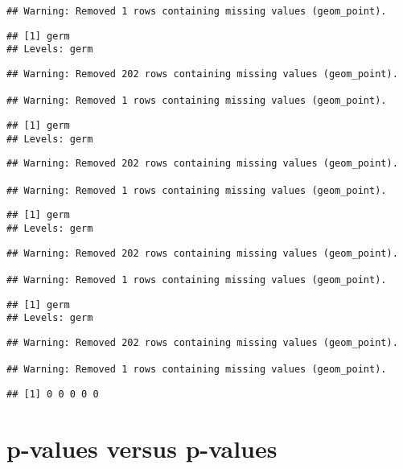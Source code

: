 \documentclass[]{article}
\begin{document}
\begin{verbatim}
## Warning: Removed 1 rows containing missing values (geom_point).
\end{verbatim}

\begin{verbatim}
## [1] germ
## Levels: germ
\end{verbatim}

\begin{verbatim}
## Warning: Removed 202 rows containing missing values (geom_point).

## Warning: Removed 1 rows containing missing values (geom_point).
\end{verbatim}

\begin{verbatim}
## [1] germ
## Levels: germ
\end{verbatim}

\begin{verbatim}
## Warning: Removed 202 rows containing missing values (geom_point).

## Warning: Removed 1 rows containing missing values (geom_point).
\end{verbatim}

\begin{verbatim}
## [1] germ
## Levels: germ
\end{verbatim}

\begin{verbatim}
## Warning: Removed 202 rows containing missing values (geom_point).

## Warning: Removed 1 rows containing missing values (geom_point).
\end{verbatim}

\begin{verbatim}
## [1] germ
## Levels: germ
\end{verbatim}

\begin{verbatim}
## Warning: Removed 202 rows containing missing values (geom_point).

## Warning: Removed 1 rows containing missing values (geom_point).
\end{verbatim}

\begin{verbatim}
## [1] 0 0 0 0 0
\end{verbatim}

\section{p-values versus p-values}
\end{document}
